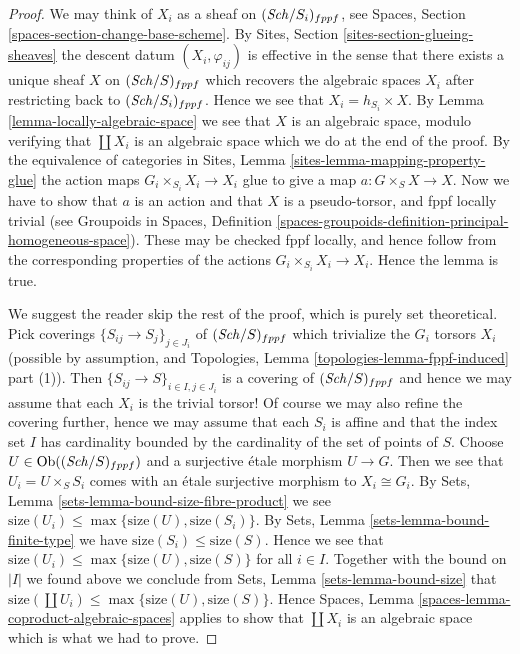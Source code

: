 \begin{proof}
We may think of $X_i$ as a sheaf on $(\mathit{Sch}/S_i)_{fppf}$, see
Spaces, Section \ref{spaces-section-change-base-scheme}.
By
Sites, Section \ref{sites-section-glueing-sheaves}
the descent datum $(X_i, \varphi_{ij})$ is effective in the sense that
there exists a unique sheaf $X$ on $(\mathit{Sch}/S)_{fppf}$ which
recovers the algebraic spaces $X_i$ after restricting back to
$(\mathit{Sch}/S_i)_{fppf}$. Hence we see that
$X_i = h_{S_i} \times X$. By
Lemma \ref{lemma-locally-algebraic-space}
we see that $X$ is an algebraic space, modulo verifying that $\coprod X_i$
is an algebraic space which we do at the end of the proof.
By the equivalence of categories in
Sites, Lemma \ref{sites-lemma-mapping-property-glue}
the action maps $G_i \times_{S_i} X_i \to X_i$
glue to give a map $a : G \times_S X \to X$.
Now we have to show that $a$ is an action and that $X$
is a pseudo-torsor, and fppf locally trivial (see
Groupoids in Spaces,
Definition \ref{spaces-groupoids-definition-principal-homogeneous-space}).
These may be checked fppf locally, and
hence follow from the corresponding properties of the actions
$G_i \times_{S_i} X_i \to X_i$. Hence the lemma is true.

\medskip\noindent
We suggest the reader skip the rest of the proof, which is purely set
theoretical. Pick coverings $\{S_{ij} \to S_j\}_{j \in J_i}$ of
$(\mathit{Sch}/S)_{fppf}$
which trivialize the $G_i$ torsors $X_i$ (possible by assumption, and
Topologies, Lemma \ref{topologies-lemma-fppf-induced} part (1)).
Then $\{S_{ij} \to S\}_{i \in I, j \in J_i}$ is a covering of
$(\mathit{Sch}/S)_{fppf}$ and hence we may assume that each $X_i$
is the trivial torsor! Of course we may also refine the covering further,
hence we may assume that each $S_i$ is affine and that the index
set $I$ has cardinality bounded by the cardinality of the set of points
of $S$. Choose $U \in \mathop{\mathrm{Ob}}\nolimits((\mathit{Sch}/S)_{fppf})$ and a surjective
\'etale morphism $U \to G$. Then we see that $U_i = U \times_S S_i$ comes
with an \'etale surjective morphism to $X_i \cong G_i$. By
Sets, Lemma \ref{sets-lemma-bound-size-fibre-product}
we see $\text{size}(U_i) \leq \max\{\text{size}(U), \text{size}(S_i)\}$. By
Sets, Lemma \ref{sets-lemma-bound-finite-type}
we have $\text{size}(S_i) \leq \text{size}(S)$.
Hence we see that
$\text{size}(U_i) \leq \max\{\text{size}(U), \text{size}(S)\}$
for all $i \in I$. Together with the bound on $|I|$ we found above we
conclude from
Sets, Lemma \ref{sets-lemma-bound-size}
that $\text{size}(\coprod U_i) \leq \max\{\text{size}(U), \text{size}(S)\}$.
Hence
Spaces, Lemma \ref{spaces-lemma-coproduct-algebraic-spaces}
applies to show that $\coprod X_i$ is an algebraic space which is
what we had to prove.
\end{proof}




